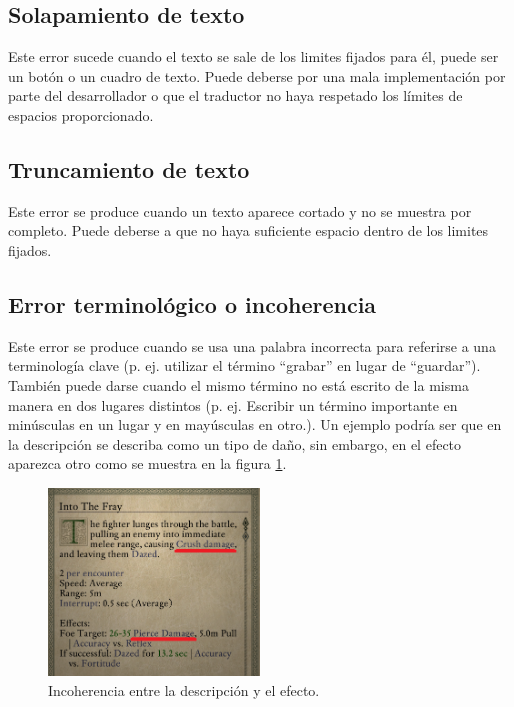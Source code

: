\subsection{Solapamiento de texto}\label{ErrorSolapamiento}
Este error sucede cuando el texto se sale de los limites fijados para él, puede ser un botón o un cuadro de texto. Puede deberse por una mala implementación por parte del desarrollador o que el traductor no haya respetado los límites de espacios proporcionado.

\subsection{Truncamiento de texto}\label{ErrorTruncamiento}
Este error se produce cuando un texto aparece cortado y no se muestra por completo. Puede deberse a que no haya suficiente espacio dentro de los limites fijados.

\subsection{Error terminológico o incoherencia}\label{ErrorTermino}
Este error se produce cuando se usa una palabra incorrecta para referirse a una
terminología clave (p. ej. utilizar el término ``grabar'' en lugar de ``guardar''). También
puede darse cuando el mismo término no está escrito de la misma manera en dos
lugares distintos (p. ej. Escribir un término importante en minúsculas en un lugar
y en mayúsculas en otro.).
Un ejemplo podría ser que en la descripción se describa como un tipo de daño, sin embargo, en el efecto aparezca otro como se muestra en la figura \ref{fig:EIncoherencia}.
\begin{figure}[H]
	\centering
	\includegraphics[width = 0.5\textwidth]{Imagenes/Errores_Localizacion/E_Incoherencia.png}
	\caption{Incoherencia entre la descripción y el efecto.}
	\label{fig:EIncoherencia}
\end{figure}

